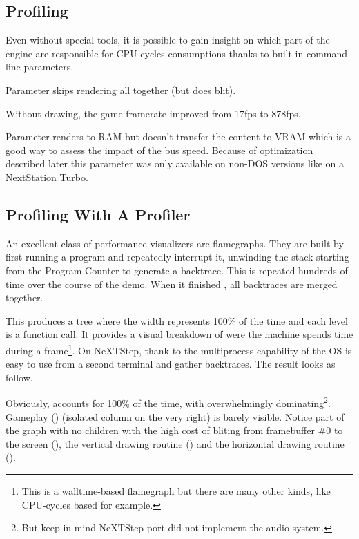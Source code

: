 \subsection{Profiling}
Even without special tools, it is possible to gain insight on which part of the engine are responsible for CPU cycles consumptions thanks to built-in command line parameters.\\
\par
Parameter  skips rendering all together (but does blit).\\
\par
\par
{}
\par
Without drawing, the game framerate improved from 17fps to 878fps.\\
\par
Parameter  renders to RAM but doesn't transfer the content to VRAM which is a good way to assess the impact of the bus speed. Because of optimization described later this parameter was only available on non-DOS versions like on a NextStation Turbo.\\
\par
{}


\vspace{-10mm}
\subsection{Profiling With A Profiler}
An excellent class of performance visualizers are flamegraphs. They are built by first running a program and repeatedly interrupt it, unwinding the stack starting from the Program Counter to generate a backtrace. This is repeated hundreds of time over the course of the demo. When it finished , all backtraces are merged together.\\
\par
 This produces a tree where the width represents 100\% of the time and each level is a function call. It provides a  visual breakdown of were the machine spends time during a frame\footnote{This is a walltime-based flamegraph but there are many other kinds, like CPU-cycles based for example.}. On NeXTStep, thank to the multiprocess capability of the OS is easy to use  from a second terminal and gather backtraces. The result looks as follow.\\
\par

\par
Obviously,  accounts for 100\% of the time, with  overwhelmingly dominating\footnote{But keep in mind NeXTStep port did not implement the audio system.}. Gameplay () (isolated column on the very right) is barely visible. Notice part of the graph with no children with the high cost of bliting from framebuffer \#0 to the screen (), the vertical drawing routine () and the horizontal drawing routine ().\\
\par

